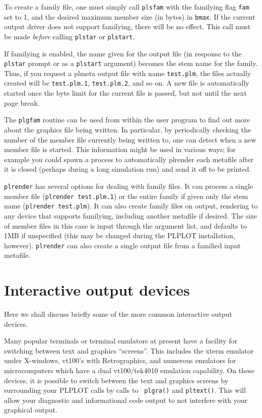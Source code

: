To create a family file, one must simply call {\tt plsfam} with the
familying flag {\tt fam} set to 1, and the desired maximum member size
(in bytes) in {\tt bmax}.  If the current output driver does not support
familying, there will be no effect.  This call must be made {\em before}
calling {\tt plstar} or {\tt plstart}.

If familying is enabled, the name given for the output file (in response to
the {\tt plstar} prompt or as a {\tt plstart} argument) becomes the stem
name for the family.  Thus, if you request a plmeta output file with name
{\tt test.plm}, the files actually created will be {\tt test.plm.1},
{\tt test.plm.2}, and so on.  A new file is automatically started once the
byte limit for the current file is passed, but not until the next page break.

The {\tt plgfam} routine can be used from within the user program to find
out more about the graphics file being written.  In particular, by
periodically checking the number of the member file currently being written
to, one can detect when a new member file is started.  This information
might be used in various ways; for example you could spawn a process to
automatically plrender each metafile after it is closed (perhaps during a
long simulation run) and send it off to be printed. 

{\tt plrender} has several options for dealing with family files.  It can
process a single member file ({\tt plrender test.plm.1}) or the entire
family if given only the stem name ({\tt plrender test.plm}).  It can also
create family files on output, rendering to any device that supports
familying, including another metafile if desired.  The size of member files
in this case is input through the argument list, and defaults to 1MB if
unspecified (this may be changed during the PLPLOT installation, however). 
{\tt plrender} can also create a single output file from a familied input
metafile.

\section{Interactive output devices}

Here we shall discuss briefly some of the more common interactive output
devices.  

Many popular terminals or terminal emulators at present have a facility for
switching between text and graphics ``screens''.  This includes the xterm
emulator under X-windows, vt100's with Retrographics, and numerous
emulators for microcomputers which have a dual vt100/tek4010 emulation
capability.  On these devices, it is possible to switch between the text
and graphics screens by surrounding your PLPLOT calls by calls to {\tt
plgra()} and {\tt pltext()}.  This will allow your diagnostic and
informational code output to not interfere with your graphical output. 

